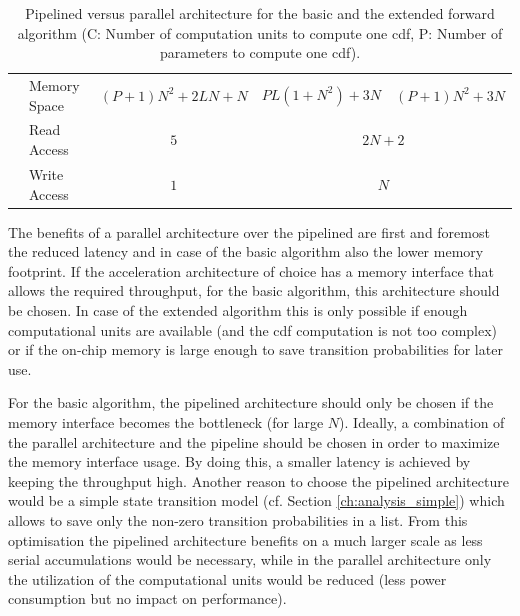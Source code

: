 \documentclass[mscthesis]{usiinfthesis}
\begin{document}
\begin{table}
\begin{center}
\begin{tabular}{|c|l|*{3}{c|}}
            \cline{2-5}
            & Memory Space
            & $(P+1)N^2+2LN+N$
            & $PL(1+N^2)+3N$ & $(P+1)N^2+3N$
            \\
            \cline{2-5}
            & Read Access
            & $5$
            & \multicolumn{2}{c|}{$2N+2$}
            \\
            \cline{2-5}
            & Write Access
            & $1$
            & \multicolumn{2}{c|}{$N$}
            \\
            \hline
        \end{tabular}
    \end{center}
    \caption{Pipelined versus parallel architecture for the basic and the
        extended forward algorithm (C: Number of computation units to compute
        one \acrshort{cdf}, P: Number of parameters to compute one
        \acrshort{cdf}).}
    \label{tab:summary_D}
\end{table}

The benefits of a parallel architecture over the pipelined are first and
foremost the reduced latency and in case of the basic algorithm also the lower
memory footprint. If the acceleration architecture of choice has a memory
interface that allows the required throughput, for the basic algorithm, this
architecture should be chosen. In case of the extended algorithm this is only
possible if enough computational units are available (and the \gls{cdf} computation
is not too complex) or if the on-chip memory is large enough to save transition
probabilities for later use.

For the basic algorithm, the pipelined architecture should only be chosen if
the memory interface becomes the bottleneck (for large $N$). Ideally,
a combination of the parallel architecture and the pipeline should be chosen in
order to maximize the memory interface usage. By doing this, a smaller latency
is achieved by keeping the throughput high. Another reason to choose the
pipelined architecture would be a simple state transition model (cf. Section
\ref{ch:analysis_simple}) which allows to save only the non-zero transition
probabilities in a list. From this optimisation the pipelined architecture
benefits on a much larger scale as less serial accumulations would be
necessary, while in the parallel architecture only the utilization of the
computational units would be reduced (less power consumption but no impact on
performance).
\end{document}
